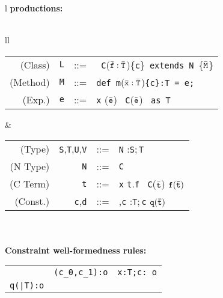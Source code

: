 
\begin{figure*}
\footnotesize
\begin{tabular}{l}
{\bf \FX{} productions:} \\
\quad\\
\begin{tabular}{ll}
\begin{tabular}{r@{\quad}r@{~~}c@{~~}l}
  (Class) & {\tt L} &{::=}& \klass\ {\tt C}($\bar{\tt f}:\bar{\tt T}$)\{{\tt c}\}\ {\tt extends}\ {\tt N}\ \{$\bar{\tt M}$\} \\
  (Method)& {\tt M} &{::=}& {\tt def}\ {\tt m}($\bar{\tt x}:\bar{\tt T}$){\tt \{c\}:T\,=\,e;}\\
  (Exp.)& {\tt e} &{::=}& {\tt x} \alt \this \alt {\tt e.f} \alt {\tt e.m}($\bar{\tt e}$) 
   \alt \new\ {\tt C}($\bar{\tt e}$) \alt {\tt e}\ \mbox{{\tt as} {\tt T}} \\ 
\end{tabular} 
&
\begin{tabular}{r@{\quad}r@{~~}c@{~~}l}
  (Type)& {\tt S},{\tt T},{\tt U},{\tt V}&{::=}& {\tt N}
        \alt {\tt T\{c\}} \alt {\tt x}:{\tt S};\,{\tt T}\\
  (N Type) & {\tt N}&{::=}& {\tt C} \alt {\tt N\{c\}}\\
  (C Term) & {\tt t} &{::=}& {\tt x} \alt \self \alt \this \alt
  {\tt t}.{\tt f} \alt \new\ {\tt C}($\bar{\tt t}$) \alt $\tt f(\bar{\tt t})$ \\
  (Const.) & {\tt c},{\tt d} &{::=}&\true \alt {\tt t==t} \alt {\tt c},{\tt c} \alt {\tt x}:{\tt T};\,{\tt c} \alt ${\tt q(\bar{\tt t})}$
\end{tabular} 
\end{tabular}
\quad \\
\quad\\
{\bf Constraint well-formedness rules:}\\[-12pt]
{\tabcolsep=0pt
\begin{tabular}{p{}p{}p{}}
\infax[True]{\Gamma \vdash {\tt true}: {\tt o}}
&
\infrule[And]
	{\Gamma\tt  \vdash c_0: o \andalso \Gamma \vdash c_1: o}
	{\Gamma\tt \vdash (c_0,c_1):o}
&
\infrule[Exists]
	{\Gamma\tt \vdash t: T \andalso \Gamma \vdash c[t/x]:o}
	{\Gamma\tt \vdash x:T;c: o}
\\
\infrule[Pred]
        {\tt q(\bar{\tt T}):{\tt o}\in {\cal C} \andalso \Gamma \vdash \bar{\tt t}:\bar{\tt T}}
        {\Gamma \vdash \tt q(\bar{\tt T}):o}
&
\infrule[Fun]
        {\tt f(\bar{\tt T}):{\tt T}\in {\cal C} \andalso \Gamma \vdash \bar{\tt t}:\bar{\tt T}}

\end{tabular}}
\end{tabular}
\end{figure*}
